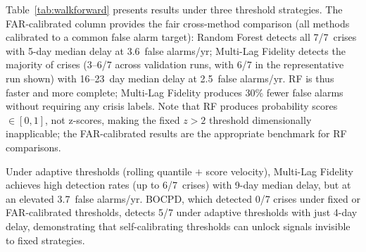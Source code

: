 \documentclass[3p]{elsarticle}
\begin{document}
Table~\ref{tab:walkforward} presents results under three threshold
strategies.  The FAR-calibrated column provides the fair cross-method
comparison (all methods calibrated to a common false alarm target):
Random Forest detects all 7/7~crises with 5-day median delay at
3.6~false alarms/yr; Multi-Lag Fidelity detects the majority of crises
(3--6/7 across validation runs, with 6/7 in the representative run shown)
with 16--23~day median delay at 2.5~false alarms/yr.  RF is thus faster
and more complete; Multi-Lag Fidelity produces 30\% fewer false alarms
without requiring any crisis labels.  Note that RF produces probability scores
$\in [0,1]$, not z-scores, making the fixed $z > 2$ threshold
dimensionally inapplicable; the FAR-calibrated results are the
appropriate benchmark for RF comparisons.

Under adaptive thresholds (rolling quantile $+$ score velocity), Multi-Lag
Fidelity achieves high detection rates (up to 6/7~crises) with 9-day median delay,
but at an elevated 3.7~false alarms/yr.  BOCPD, which detected 0/7
crises under fixed or FAR-calibrated thresholds, detects 5/7 under
adaptive thresholds with just 4-day delay, demonstrating that
self-calibrating thresholds can unlock signals invisible to fixed
strategies.
\end{document}
